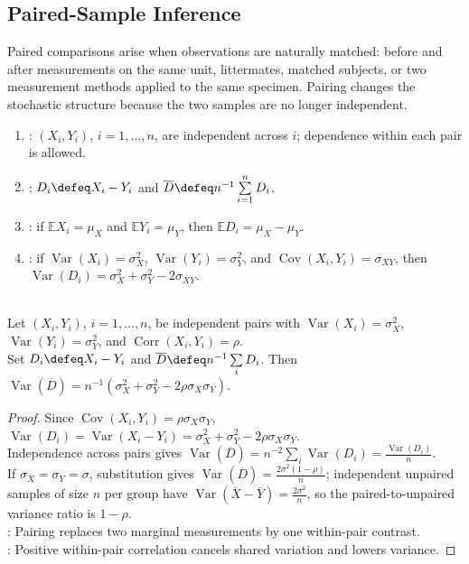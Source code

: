 \subsection{Paired-Sample Inference}

Paired comparisons arise when observations are naturally matched: before and after measurements on the same unit, littermates, matched subjects, or two measurement methods applied to the same specimen.  Pairing changes the stochastic structure because the two samples are no longer independent.

\begin{definition} \label{def:paired-sample-differences} 
\begin{enumerate}[label=(\roman*)]
\setlength{\itemsep}{0pt}
\item {}: $(X_i,Y_i)$, $i=1,\ldots,n$, are independent across $i$; dependence within each pair is allowed.
\item {}: $D_i\defeq X_i-Y_i$ and $\overline{D}\defeq n^{-1}\sum\limits_{i=1}^nD_i$.
\item {}: if $\mathbb{E}X_i=\mu_X$ and $\mathbb{E}Y_i=\mu_Y$, then $\mathbb{E}D_i=\mu_X-\mu_Y$.
\item {}: if $\operatorname{Var}(X_i)=\sigma_X^2$, $\operatorname{Var}(Y_i)=\sigma_Y^2$, and $\operatorname{Cov}(X_i,Y_i)=\sigma_{XY}$, then $\operatorname{Var}(D_i)=\sigma_X^2+\sigma_Y^2-2\sigma_{XY}$.
\end{enumerate}
\end{definition}

\begin{proposition} \label{prop:pairing-variance-reduction} \\
Let $(X_i,Y_i)$, $i=1,\ldots,n$, be independent pairs with $\operatorname{Var}(X_i)=\sigma_X^2$, $\operatorname{Var}(Y_i)=\sigma_Y^2$, and $\operatorname{Corr}(X_i,Y_i)=\rho$.\\
Set $D_i\defeq X_i-Y_i$ and $\overline{D}\defeq n^{-1}\sum\limits_iD_i$. Then $\operatorname{Var}(\overline{D})=n^{-1}(\sigma_X^2+\sigma_Y^2-2\rho\sigma_X\sigma_Y)$.
\begin{proof} Since $\operatorname{Cov}(X_i,Y_i)=\rho\sigma_X\sigma_Y$, $\operatorname{Var}(D_i)=\operatorname{Var}(X_i-Y_i)=\sigma_X^2+\sigma_Y^2-2\rho\sigma_X\sigma_Y$.\\
Independence across pairs gives $\operatorname{Var}(\overline{D})=n^{-2}\sum\limits_i\operatorname{Var}(D_i)=\frac{\operatorname{Var}(D_i)}{n}$.\\
If $\sigma_X=\sigma_Y=\sigma$, substitution gives $\operatorname{Var}(\overline{D})=\frac{2\sigma^2(1-\rho)}{n}$; independent unpaired samples of size $n$ per group have $\operatorname{Var}(\overline{X}-\overline{Y})=\frac{2\sigma^2}{n}$, so the paired-to-unpaired variance ratio is $1-\rho$.\\
: Pairing replaces two marginal measurements by one within-pair contrast.\\
: Positive within-pair correlation cancels shared variation and lowers variance.
\end{proof}
\end{proposition}

